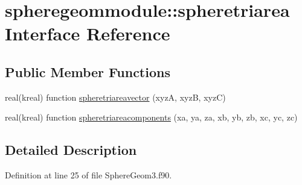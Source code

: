 \hypertarget{interfacespheregeommodule_1_1spheretriarea}{\section{spheregeommodule\+:\+:spheretriarea Interface Reference}
\label{interfacespheregeommodule_1_1spheretriarea}
}
\subsection*{Public Member Functions}
\begin{DoxyCompactItemize}
\item 
real(kreal) function \hyperlink{interfacespheregeommodule_1_1spheretriarea_abb18b0da23bb494b49c84f7353b70a7e}{spheretriareavector} (xyz\+A, xyz\+B, xyz\+C)
\item 
real(kreal) function \hyperlink{interfacespheregeommodule_1_1spheretriarea_adb4df7f4f9a0518b12665da852815b77}{spheretriareacomponents} (xa, ya, za, xb, yb, zb, xc, yc, zc)
\end{DoxyCompactItemize}


\subsection{Detailed Description}


Definition at line 25 of file Sphere\+Geom3.\+f90.



